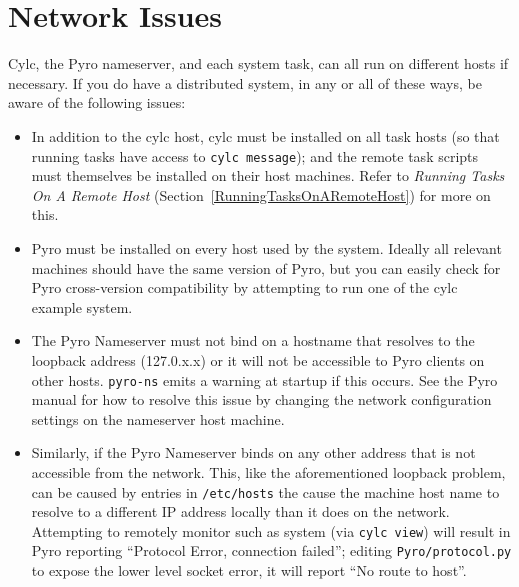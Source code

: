 \documentclass[11pt,a4paper]{article}
\begin{document}
\section{Network Issues}

Cylc, the Pyro nameserver, and each system task, can all run on
different hosts if necessary.  If you do have a distributed system, in 
any or all of these ways, be aware of the following issues: 

\begin{itemize}

    \item In addition to the cylc host, cylc must be installed on all
        task hosts (so that running tasks have access to 
        \lstinline=cylc message=); and the remote task scripts must
        themselves be installed on their host machines.  Refer to {\em
        Running Tasks On A Remote Host}
        (Section~\ref{RunningTasksOnARemoteHost}) for more on this.

    \item Pyro must be installed on every host used by the system.
         Ideally all relevant machines should have the same version of
         Pyro, but you can easily check for Pyro cross-version
         compatibility by attempting to run one of the cylc example
         system.
        
    \item The Pyro Nameserver must not bind on a hostname that resolves
        to the loopback address (127.0.x.x) or it will not be accessible
        to Pyro clients on other hosts.  \lstinline=pyro-ns= emits a
        warning at startup if this occurs.  See the Pyro manual for how
        to resolve this issue by changing the network configuration
        settings on the nameserver host machine. 

    \item Similarly, if the Pyro Nameserver binds on any other address
        that is not accessible from the network. This, like the
        aforementioned loopback problem, can be caused by entries in
        \lstinline=/etc/hosts= the cause the machine host name to
        resolve to a different IP address locally than it does on the
        network. Attempting to remotely monitor such as system (via
        \lstinline=cylc view=) will result in Pyro reporting 
        ``Protocol Error, connection failed''; editing 
        \lstinline=Pyro/protocol.py= to expose the lower level 
        socket error, it will report ``No route to host''.

\end{itemize}
\end{document}
